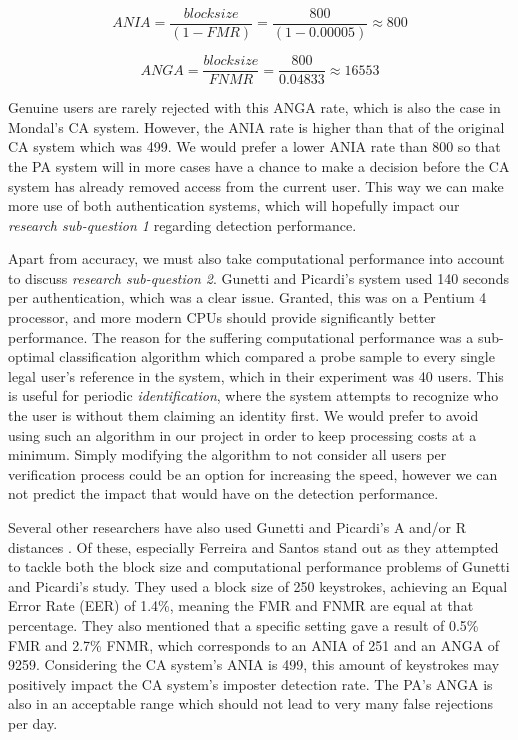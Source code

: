 \documentclass[informationsecurity]{gucmasterproject}
\begin{document}
\begin{equation}
ANIA = \frac{block size}{(1-FMR)} = \frac{800}{(1-0.00005)} \approx 800
\end{equation}

\begin{equation}
ANGA = \frac{block size}{FNMR} = \frac{800}{0.04833} \approx 16553
\end{equation}

Genuine users are rarely rejected with this ANGA rate, which is also the case in Mondal's \cite{mondal} CA system.
However, the ANIA rate is higher than that of the original CA system which was 499.
We would prefer a lower ANIA rate than 800 so that the PA system will in more cases have a chance to make a decision before the CA system has already removed access from the current user.
This way we can make more use of both authentication systems, which will hopefully impact our \textit{research sub-question 1} regarding detection performance.

Apart from accuracy, we must also take computational performance into account to discuss \textit{research sub-question 2}.
Gunetti and Picardi's \cite{gnp} system used 140 seconds per authentication, which was a clear issue.
Granted, this was on a Pentium 4 processor, and more modern CPUs should provide significantly better performance.
The reason for the suffering computational performance was a sub-optimal classification algorithm which compared a probe sample to every single legal user's reference in the system, which in their experiment was 40 users.
This is useful for periodic \textit{identification}, where the system attempts to recognize who the user is without them claiming an identity first.
We would prefer to avoid using such an algorithm in our project in order to keep processing costs at a minimum.
Simply modifying the algorithm to not consider all users per verification process could be an option for increasing the speed, however we can not predict the impact that would have on the detection performance.

Several other researchers have also used Gunetti and Picardi's A and/or R distances \cite{davoudi2009, davoudi2010, superResults, hu, sliding, Kolakowska2011, Messerman, Pinto2014, meaningless}.
Of these, especially Ferreira and Santos \cite{superResults} stand out as they attempted to tackle both the block size and computational performance problems of Gunetti and Picardi's \cite{gnp} study.
They used a block size of 250 keystrokes, achieving an Equal Error Rate (EER) of 1.4\%, meaning the FMR and FNMR are equal at that percentage.
They also mentioned that a specific setting gave a result of 0.5\% FMR and 2.7\% FNMR, which corresponds to an ANIA of 251 and an ANGA of 9259.
Considering the CA system's ANIA is 499, this amount of keystrokes may positively impact the CA system's imposter detection rate.
The PA's ANGA is also in an acceptable range which should not lead to very many false rejections per day.
\end{document}
